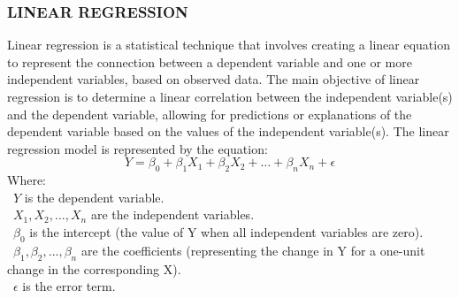\documentclass{ieeeojies}
\begin{document}
\subsubsection{LINEAR REGRESSION}
Linear regression is a statistical technique that involves creating a linear equation to represent the connection between a dependent variable and one or more independent variables, based on observed data. The main objective of linear regression is to determine a linear correlation between the independent variable(s) and the dependent variable, allowing for predictions or explanations of the dependent variable based on the values of the independent variable(s). The linear regression model is represented by the equation:
\[Y = \beta_0 + \beta_1 X_1 + \beta_2 X_2 + \ldots + \beta_n X_n + \epsilon\]
Where:\\
        \indent\textbullet\ \(Y\) is the dependent variable.\\
        \indent\textbullet\ \(X_1, X_2,...,X_n\) are the independent variables.\\
        \indent\textbullet\ \(\beta_0\) is the intercept (the value of Y when all independent variables are zero).\\
        \indent\textbullet\ \(\beta_1, \beta_2,..., \beta_n\) are the coefficients (representing the change in Y for a one-unit change in the corresponding X).\\
        \indent\textbullet\ \(\epsilon\) is the error term.
\end{document}
